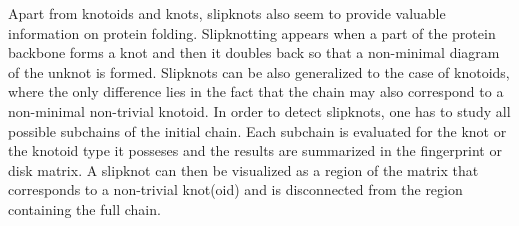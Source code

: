 Apart from knotoids and knots, slipknots also seem to provide valuable information on protein folding\cite{yeates}. Slipknotting appears when a part of the protein backbone forms a knot and then it doubles back so that a non-minimal diagram of the unknot is formed\cite{yeates}. Slipknots can be also generalized to the case of knotoids, where the only difference lies in the fact that the chain may also correspond to a non-minimal non-trivial knotoid. In order to detect slipknots, one has to study all possible subchains of the initial chain. Each subchain is evaluated for the knot or the knotoid type it posseses and the results are summarized in the fingerprint\cite{yeates, sulkowska2012,gound} or disk matrix\cite{rawdon}.
A slipknot can then be visualized as a  region of the matrix that corresponds to a non-trivial knot(oid) and  is disconnected from the region containing the full chain.



\clearpage
